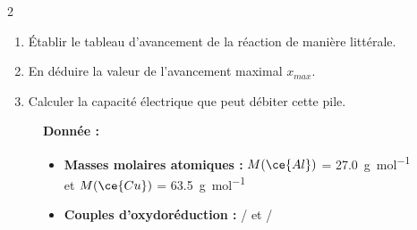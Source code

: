 \documentclass[a4paper,11pt,fleqn]{article}%
\begin{document}
\begin{multicols}{2}
\begin{enumerate}[resume]
    \item Établir le tableau d'avancement de la réaction de manière littérale.
    \item En déduire la valeur de l'avancement maximal $x_{max}$.
    \item Calculer la capacité électrique que peut débiter cette pile.
\end{enumerate}
\begin{figure}[H]
    \begin{minipage}{\linewidth}
    \textbf{Donnée :}
    \begin{itemize}
        \item \textbf{Masses molaires atomiques :} $M(\ce{Al})$ = \SI{27,0}{\gram\per\mole} et $M(\ce{Cu})$ = \SI{63,5}{\gram\per\mole}
        \item \textbf{ Couples d'oxydoréduction :} / et /
    \end{itemize}
    \end{minipage}
\end{figure}
\end{multicols}
\end{document}
